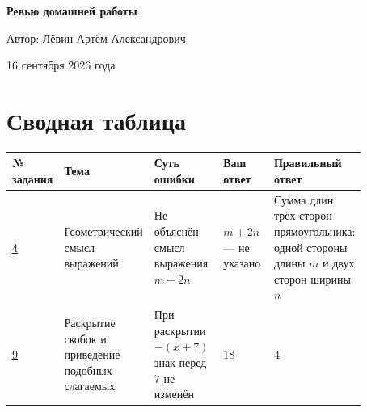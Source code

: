 \documentclass[12pt,a4paper]{article}
\begin{document}

\begin{titlepage}
\centering
\vspace*{\fill}

{\LARGE\bfseries Ревью домашней работы\par}

\vspace{1.2cm}

{\large Автор: Лёвин Артём Александрович\par}

\vspace{0.6cm}

{\large 16 сентября 2026 года\par}

\vspace*{\fill}


\end{titlepage}

\newpage
\section*{Сводная таблица}

{\small
\begin{center}
\begin{tabular}{p{0.09\linewidth} p{0.17\linewidth} p{0.25\linewidth} p{0.18\linewidth} p{0.18\linewidth}}
\toprule
\textbf{№ задания} & \textbf{Тема} & \textbf{Суть ошибки} & \textbf{Ваш ответ} & \textbf{Правильный ответ} \\
\midrule
\hyperref[task:4]{4} &
Геометрический смысл выражений &
Не объяснён смысл выражения $m+2n$ &
$m+2n$ --- не указано &
Сумма длин трёх сторон прямоугольника: одной стороны длины $m$ и двух сторон ширины $n$ \\
\addlinespace
\hyperref[task:9]{9} &
Раскрытие скобок и приведение подобных слагаемых &
При раскрытии $-(x+7)$ знак перед $7$ не изменён &
$18$ &
$4$ \\
\bottomrule
\end{tabular}
\end{center}
}
\end{document}
